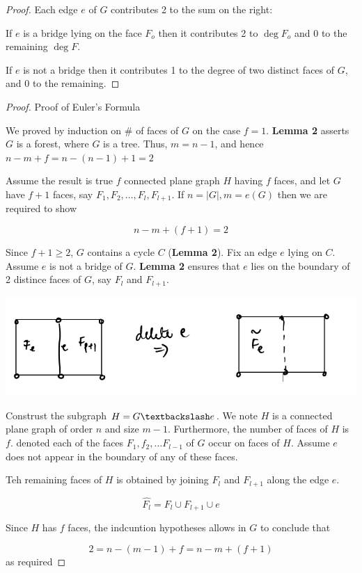\documentclass[12pt]{article}
\newenvironment{pro}{\begin{proof}}{\end{proof}}
\begin{document}
\begin{pro}
	Each edge $e$ of $G$ contributes 2 to the sum on the right:

	If $e$ is a bridge lying on the face $F_{o}$ then it contributes 2 to $\deg F_{o}$ and 0 to the remaining $\deg F$.


	If $e$ is not a bridge then it contributes 1 to the degree of two distinct faces of $G$, and 0 to the remaining.
\end{pro}


\begin{pro}

	Proof of Euler's Formula

	We proved by induction on $\#$ of faces of $G$ on the case $f=1$. \textbf{Lemma 2} asserts $G$ is a forest, where $G$ is a tree.
	Thus, $m=n-1$, and hence $n-m +f = n-(n-1)+1 = 2$

	Assume the result is true $f$ connected plane graph $H$ having $f$ faces, and let $G$ have $f+1$ faces, say $F_{1}, F_{2}, \dots, F_{l}, F_{l+1}$.
	If $n = \vert G\vert, m = e(G)$ then we are required to show

	\[n-m +(f+1) = 2\]

	Since $f+1\ge 2$, $G$ contains a cycle $C$ (\textbf{Lemma 2}). Fix an edge $e$ lying on $C$. Assume $e$ is not a bridge of $G$. \textbf{Lemma 2} ensures that $e$ lies on the boundary of 2 distince faces of $G$, say $F_{l}$ and $F_{l+1}$.

	\includegraphics[scale=0.5]{eulerproof}

	Construst the subgraph $H=G\textbackslash e$. We note $H$ is a connected plane graph of order $n$ and size $m-1$.
	Furthermore, the number of faces of $H$ is $f$. denoted each of the faces $F_{1}, f_{2},\dots F_{l-1}$ of $G$ occur on faces of $H$. Assume $e$ does not appear in the boundary of any of these faces.

	Teh remaining faces of $H$ is obtained by joining $F_{l}$ and $F_{l+1}$ along the edge $e$.

	\[\hat{F_{l}} = F_{l} \cup F_{l+1} \cup e\]

	Since $H$ has $f$ faces, the indcuntion hypotheses allows in $G$ to conclude that

	\[ 2 = n- (m-1) + f = n - m + (f+1)\]
	as required

\end{pro}
\end{document}
